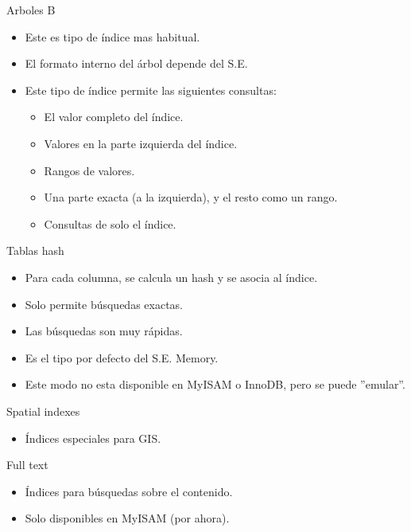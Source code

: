 \begin{frame}{Arboles B}
  \begin{itemize}
    \item Este es tipo de índice mas habitual.
    \item El formato interno del árbol depende del S.E.
    \item Este tipo de índice permite las siguientes consultas:
    \begin{itemize}
      \item El valor completo del índice.
      \item Valores en la parte izquierda del índice.
      \item Rangos de valores.
      \item Una parte exacta (a la izquierda), y el resto como un rango.
      \item Consultas de solo el índice.
    \end{itemize}
  \end{itemize}
\end{frame}

\begin{frame}{Tablas hash}
  \begin{itemize}
    \item Para cada columna, se calcula un hash y se asocia al índice.
    \item Solo permite búsquedas exactas.
    \item Las búsquedas son muy rápidas.
    \item Es el tipo por defecto del S.E. Memory.
    \item Este modo no esta disponible en MyISAM o InnoDB, pero se puede ''emular''.
  \end{itemize}
\end{frame}

\begin{frame}{Spatial indexes}
  \begin{itemize}
    \item Índices especiales para GIS.
  \end{itemize}
\end{frame}

\begin{frame}{Full text}
  \begin{itemize}
    \item Índices para búsquedas sobre el contenido.
    \item Solo disponibles en MyISAM (por ahora).
  \end{itemize}
\end{frame}

